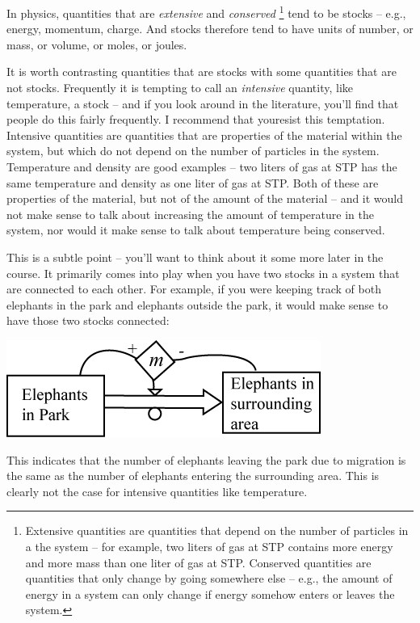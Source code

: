 In physics, quantities that are {\it extensive} and {\it conserved} \footnote{Extensive quantities are quantities that depend on the number of particles in a the system -- for example, two liters of gas at STP contains more energy and more mass than one liter of gas at STP. Conserved quantities are quantities that only change by going somewhere else -- e.g., the amount of energy in a system can only change if energy somehow enters or leaves the system.}  tend to be stocks -- e.g., energy, momentum, charge.  And stocks therefore tend to have units of number, or mass, or volume, or moles, or joules.

It is worth contrasting quantities that are stocks with some quantities that are not stocks.  Frequently it is tempting to call an {\it intensive} quantity, like temperature, a stock -- and if you look around in the literature, you'll find that people do this fairly frequently.  I recommend that youresist this temptation. Intensive quantities are quantities that are properties of the material within the system, but which do not depend on the number of particles in the system.  Temperature and density are good examples -- two liters of gas at STP has the same temperature and density as one liter of gas at STP.  Both of these are properties of the material, but not of the amount of the material -- and it would not make sense to talk about increasing the amount of temperature in the system, nor would it make sense to talk about temperature being conserved.  

This is a subtle point -- you'll want to think about it some more later in the course. It primarily comes into play when you have two stocks in a system that are connected to each other.  For example, if you were keeping track of both elephants in the park and elephants outside the park, it would make sense to have those two stocks connected:

\beforefig
\centerline{\includegraphics[height=.6in]{figs/TwoStockElephantsExample1}}
\afterfig
This indicates that the number of elephants leaving the park due to migration is the same as the number of elephants entering the surrounding area.    This is clearly not the case for intensive quantities like temperature. 


